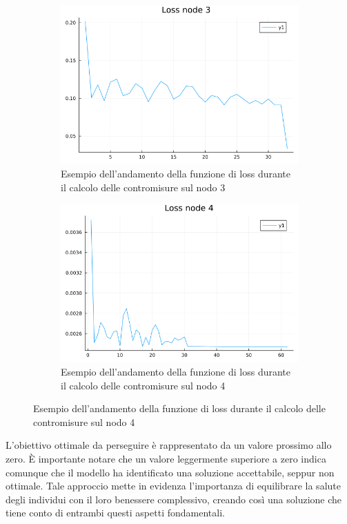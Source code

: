 \begin{figure}[H]
\begin{subfigure}[b]{0.45\textwidth}
		\includegraphics[width=\textwidth]{img/loss3.png}
		\caption{Esempio dell'andamento della funzione di loss durante il calcolo delle contromisure sul nodo 3}
		\label{fig:loss3}
	\end{subfigure}
	\hfill
	\begin{subfigure}[b]{0.45\textwidth}
		\centering
		\includegraphics[width=\textwidth]{img/loss4.png}
		\caption{Esempio dell'andamento della funzione di loss durante il calcolo delle contromisure sul nodo 4}
		\label{fig:loss4}
	\end{subfigure}
\end{figure}

L'obiettivo ottimale da perseguire è rappresentato da un valore prossimo 
allo zero. È importante notare che un valore leggermente superiore a zero 
indica comunque che il modello ha identificato una soluzione accettabile, 
seppur non ottimale. Tale approccio mette in evidenza l'importanza di 
equilibrare la salute degli individui con il loro benessere complessivo, 
creando così una soluzione che tiene conto di entrambi questi aspetti 
fondamentali.

